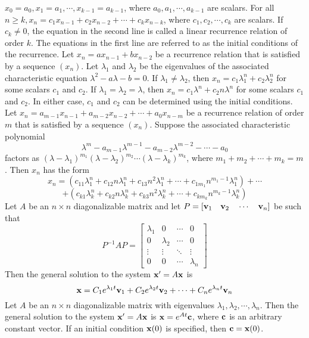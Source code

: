 \documentclass{article}
\begin{document}
\begin{outline}
                \2 \(x_0=a_0,x_1=a_1,\cdots,x_{k-1}=a_{k-1}\), where \(a_0,a_1,\cdots,a_{k-1}\) are scalars. 
                \2 For all \(n\geq k,x_n=c_1x_{n-1}+c_2x_{n-2}+\cdots+c_kx_{n-k}\), where \(c_1,c_2,\cdots,c_k\) are scalars. 
            \1 If \(c_k\neq 0\), the equation in the second line is called a linear recurrence relation of order $k$. The equations in the first line are referred to as the initial conditions of the recurrence. 
            \1 Let \(x_n=ax_{n-1}+bx_{n-2}\) be a recurrence relation that is satisfied by a sequence \((x_n)\). Let \(\lambda_1\) and \(\lambda_2\) be the eigenvalues of the associated characteristic equation \(\lambda^2-a\lambda-b=0\). 
                \2 If \(\lambda_1\neq \lambda_2\), then \(x_n=c_1\lambda_1^n+c_2\lambda_2^n\) for some scalars \(c_1\) and \(c_2\). 
                \2 If \(\lambda_1=\lambda_2=\lambda\), then \(x_n=c_1\lambda^n+c_2n\lambda^n\) for some scalars \(c_1\) and \(c_2\). 
            \1 In either case, \(c_1\) and \(c_2\) can be determined using the initial conditions. 
            \1 Let \(x_n=a_{m-1}x_{n-1}+a_{m-2}x_{n-2}+\cdots+a_0x_{n-m}\) be a recurrence relation of order \(m\) that is satisfied by a sequence \((x_n)\). Suppose the associated characteristic polynomial \[\lambda^m-a_{m-1}\lambda^{m-1}-a_{m-2}\lambda^{m-2}-\cdots-a_0\] factors as \((\lambda-\lambda_1)^{m_1}(\lambda-\lambda_2)^{m_2}\cdots(\lambda-\lambda_k)^{m_k}\), where \(m_1+m_2+\cdots+m_k=m\). Then \(x_n\) has the form \[x_n=(c_{11}\lambda_1^n+c_{12}n\lambda_1^n+c_{13}n^2\lambda_1^n+\cdots+c_{1m_1}n^{m_1-1}\lambda_1^n)+\cdots\]\[+(c_{k1}\lambda_k^n+c_{k2}n\lambda_k^n+c_{k3}n^2\lambda_k^n+\cdots+c_{km_k}n^{m_k-1}\lambda_k^n)\]
            \1 Let $A$ be an \(n\times n\) diagonalizable matrix and let \(P=[\vb v_1\quad\vb v_2\quad \cdots\quad \vb v_n]\) be such that \[P^{-1}AP=\begin{bmatrix}
                \lambda_1 & 0 & \cdots & 0\\ 0 & \lambda_2 & \cdots& 0\\\vdots &\vdots& \ddots &\vdots\\0&0&\cdots&\lambda_n
            \end{bmatrix}\] Then the general solution to the system \(\vb x'=A\vb x\) is \[\vb x=C_1e^{\lambda_1t}\vb v_1+C_2e^{\lambda_2t}\vb v_2+\cdots+C_ne^{\lambda_nt}\vb v_n\]
            \1 Let $A$ be an \(n\times n\) diagonalizable matrix with eigenvalues \(\lambda_1,\lambda_2,\cdots,\lambda_n\). Then the general solution to the system \(\vb x'=A\vb x\) is \(\vb x=e^{At}\vb c\), where \(\vb c\) is an arbitrary constant vector. If an initial condition \(\vb x(0)\) is specified, then \(\vb c=\vb x(0)\). 

\end{outline}
\end{document}
